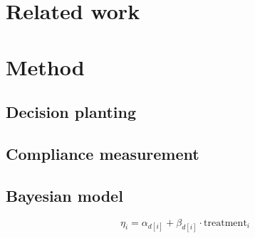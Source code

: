\documentclass{llncs}
\begin{document}
\section{Related work}
\label{sec:related}

\section{Method}
\label{sec:method}

\subsection{Decision planting}

\subsection{Compliance measurement}

\subsection{Bayesian model}
\[ \eta_i = \alpha_{d[i]} + \beta_{d[i]} \cdot \mathrm{treatment}_i \]
\end{document}
